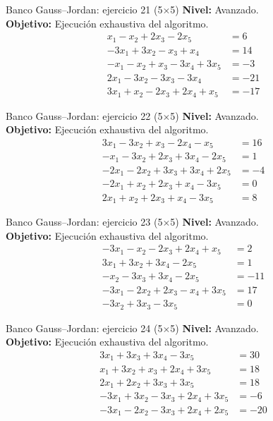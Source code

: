 \documentclass[aspectratio=169,9pt]{beamer}
\theoremstyle{remark}
\begin{document}
\begin{frame}[t]{Banco Gauss--Jordan: ejercicio 21 (5$\times$5)}
\textbf{Nivel:} Avanzado.\\
\textbf{Objetivo:} Ejecución exhaustiva del algoritmo.
\[
\begin{aligned}
x_{1} - x_{2} + 2 x_{3} - 2 x_{5} &= 6\\
- 3 x_{1} + 3 x_{2} - x_{3} + x_{4} &= 14\\
- x_{1} - x_{2} + x_{3} - 3 x_{4} + 3 x_{5} &= -3\\
2 x_{1} - 3 x_{2} - 3 x_{3} - 3 x_{4} &= -21\\
3 x_{1} + x_{2} - 2 x_{3} + 2 x_{4} + x_{5} &= -17
\end{aligned}
\]
\end{frame}
\begin{frame}[t]{Banco Gauss--Jordan: ejercicio 22 (5$\times$5)}
\textbf{Nivel:} Avanzado.\\
\textbf{Objetivo:} Ejecución exhaustiva del algoritmo.
\[
\begin{aligned}
3 x_{1} - 3 x_{2} + x_{3} - 2 x_{4} - x_{5} &= 16\\
- x_{1} - 3 x_{2} + 2 x_{3} + 3 x_{4} - 2 x_{5} &= 1\\
- 2 x_{1} - 2 x_{2} + 3 x_{3} + 3 x_{4} + 2 x_{5} &= -4\\
- 2 x_{1} + x_{2} + 2 x_{3} + x_{4} - 3 x_{5} &= 0\\
2 x_{1} + x_{2} + 2 x_{3} + x_{4} - 3 x_{5} &= 8
\end{aligned}
\]
\end{frame}
\begin{frame}[t]{Banco Gauss--Jordan: ejercicio 23 (5$\times$5)}
\textbf{Nivel:} Avanzado.\\
\textbf{Objetivo:} Ejecución exhaustiva del algoritmo.
\[
\begin{aligned}
- 3 x_{1} - x_{2} - 2 x_{3} + 2 x_{4} + x_{5} &= 2\\
3 x_{1} + 3 x_{2} + 3 x_{4} - 2 x_{5} &= 1\\
- x_{2} - 3 x_{3} + 3 x_{4} - 2 x_{5} &= -11\\
- 3 x_{1} - 2 x_{2} + 2 x_{3} - x_{4} + 3 x_{5} &= 17\\
- 3 x_{2} + 3 x_{3} - 3 x_{5} &= 0
\end{aligned}
\]
\end{frame}
\begin{frame}[t]{Banco Gauss--Jordan: ejercicio 24 (5$\times$5)}
\textbf{Nivel:} Avanzado.\\
\textbf{Objetivo:} Ejecución exhaustiva del algoritmo.
\[
\begin{aligned}
3 x_{1} + 3 x_{3} + 3 x_{4} - 3 x_{5} &= 30\\
x_{1} + 3 x_{2} + x_{3} + 2 x_{4} + 3 x_{5} &= 18\\
2 x_{1} + 2 x_{2} + 3 x_{3} + 3 x_{5} &= 18\\
- 3 x_{1} + 3 x_{2} - 3 x_{3} + 2 x_{4} + 3 x_{5} &= -6\\
- 3 x_{1} - 2 x_{2} - 3 x_{3} + 2 x_{4} + 2 x_{5} &= -20
\end{aligned}
\]
\end{frame}
\end{document}
